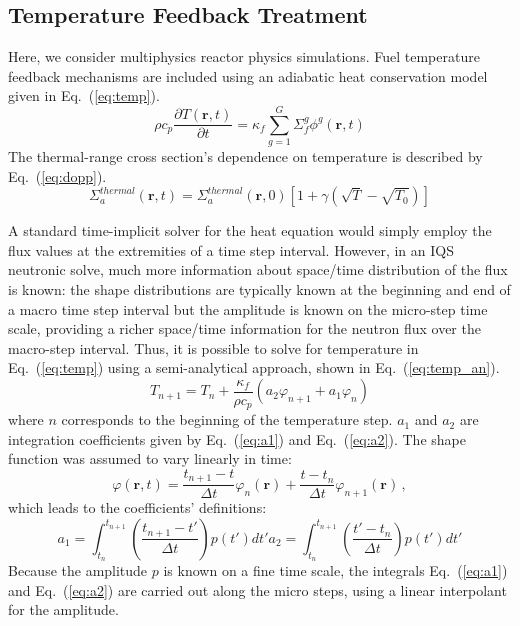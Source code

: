 \documentclass{elsarticle}
\renewcommand{\vec}[1]{\bm{#1}} %
\newcommand{\eqt}[1]{Eq.~(\ref{#1})}                     %
\newcommand{\be}{\begin{equation}}
\newcommand{\ee}{\end{equation}}
\begin{document}
\subsection{Temperature Feedback Treatment}

Here, we consider multiphysics reactor physics simulations.  Fuel temperature feedback mechanisms are included using an adiabatic heat conservation model given in \eqt{eq:temp}.  
\be
\rho c_p \frac{\partial T(\vec{r},t)}{\partial t} = \kappa_f \sum^G_{g=1}\Sigma_f^g \phi^g(\vec{r},t)
\label{eq:temp}
\ee
The thermal-range cross section's dependence on temperature is described by \eqt{eq:dopp}.
\be
\Sigma_a^{thermal}(\vec{r},t) = \Sigma_a^{thermal}(\vec{r},0)\left[1+\gamma\left(\sqrt{T}-\sqrt{T_0}\right)\right]
\label{eq:dopp}
\ee

A standard time-implicit solver for the heat equation would simply employ the flux values at the extremities of a time step interval.  However, in an IQS neutronic solve, much more information about space/time distribution of the flux is known: the shape distributions are typically known at the beginning and end of a macro time step interval but the amplitude is known on the micro-step time scale, providing a richer space/time information for the neutron flux over the macro-step interval. Thus, it is possible to solve for temperature in \eqt{eq:temp} using a semi-analytical approach, shown in \eqt{eq:temp_an}.
\be
T_{n+1} = T_n + \frac{\kappa_f}{\rho c_p} \left(a_2 \varphi_{n+1} + a_1 \varphi_{n}\right)
\label{eq:temp_an}
\ee
where $n$ corresponds to the beginning of the temperature step.  $a_1$ and $a_2$ are integration coefficients 
given by \eqt{eq:a1} and \eqt{eq:a2}.  The shape function was assumed to vary linearly in time:
\be
\varphi(\vec{r},t) = \frac{t_{n+1}-t}{\Delta t}\varphi_{n}(\vec{r}) + \frac{t-t_n}{\Delta t}\varphi_{n+1}(\vec{r})  \,,
\ee
which leads to the coefficients' definitions:
\begin{subequations}
\be
a_1 = \int_{t_n}^{t_{n+1}}\left(\frac{t_{n+1}-t'}{\Delta t}\right)p(t')dt'
\label{eq:a1}
\ee
\be
a_2 = \int_{t_n}^{t_{n+1}}\left(\frac{t'-t_n}{\Delta t}\right)p(t')dt'
\label{eq:a2}
\ee
\end{subequations}
Because the amplitude $p$ is known on a fine time scale, the integrals \eqt{eq:a1} and \eqt{eq:a2}
are carried out along the micro steps, using a linear interpolant for the amplitude.
\end{document}
